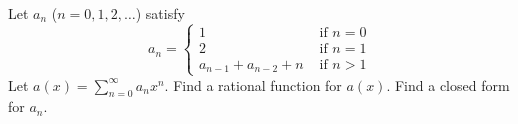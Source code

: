 Let $a_n$ ($n=0, 1, 2, \ldots$) satisfy
\[
a_n = 
\begin{cases}
1 &\text{ if } n = 0 \\
2 &\text{ if } n = 1 \\
a_{n-1} + a_{n-2} + n &\text{ if } n > 1
\end{cases}
\]
Let $a(x) = \sum_{n=0}^\infty a_n x^n$.
Find a rational function for $a(x)$.
Find a closed form for $a_n$.
